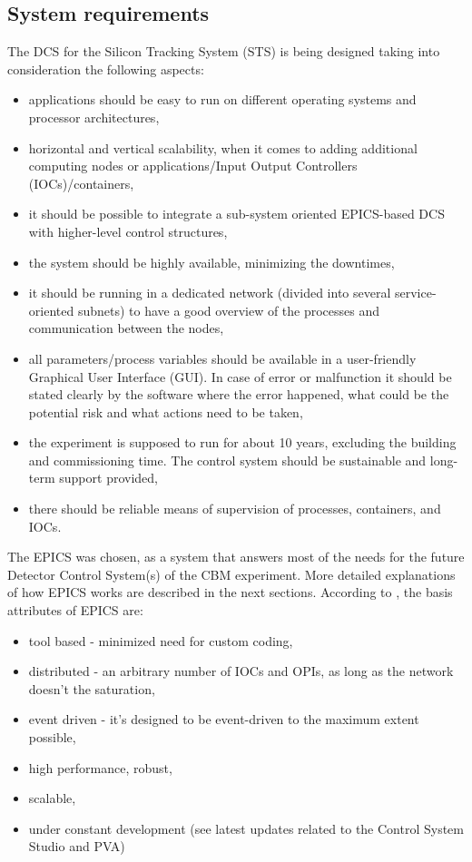 \subsection{System requirements}
 The \gls{DCS} for the Silicon Tracking System (\gls{STS}) is being designed taking into consideration the following aspects:
 \begin{itemize}
     \item applications should be easy to run on different operating systems and processor architectures,
     \item horizontal and vertical scalability, when it comes to adding additional computing nodes or applications/Input Output Controllers (\gls{IOC}s)/containers,
     \item it should be possible to integrate a sub-system oriented \gls{EPICS}-based \gls{DCS} with higher-level control structures,
     \item the system should be highly available, minimizing the downtimes,
     \item it should be running in a dedicated network (divided into several service-oriented subnets) to have a good overview of the processes and communication between the nodes,
     \item all parameters/process variables should be available in a user-friendly Graphical User Interface (\gls{GUI}). In case of error or malfunction it should be stated clearly by the software where the error happened, what could be the potential risk and what actions need to be taken,
     \item the experiment is supposed to run for about 10 years, excluding the building and commissioning time. The control system should be sustainable and long-term support provided,
     \item there should be reliable means of supervision of processes, containers, and \gls{IOC}s.
 \end{itemize}

The \gls{EPICS} was chosen, as a system that answers most of the needs for the future Detector Control System(s) of the \gls{CBM} experiment. More detailed explanations of how \gls{EPICS} works are described in the next sections. According to \cite{EPICS_DOCS}, the basis attributes of \gls{EPICS} are:
\begin{itemize}
    \item tool based - minimized need for custom coding,
    \item distributed - an arbitrary number of \gls{IOC}s and \gls{OPI}s, as long as the network doesn't the saturation,
    \item event driven - it's designed to be event-driven to the maximum extent possible,
    \item high performance, robust,
    \item scalable,
    \item under constant development (see latest updates related to the Control System Studio and PVA)
\end{itemize}

